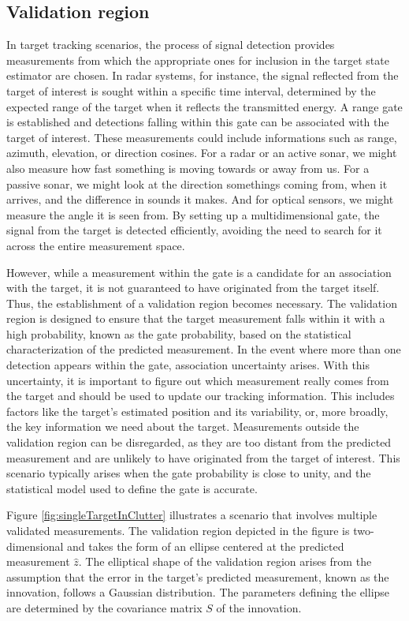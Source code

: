 \subsection{Validation region}
\label{sec:validation_region}
In target tracking scenarios, the process of signal detection provides measurements from which the appropriate ones
for inclusion in the target state estimator are chosen. In radar systems, for instance, the signal reflected from the
target of interest is sought within a specific time interval, determined by the expected range of the target when it
reflects the transmitted energy. A range gate is established and detections falling within this gate can be
associated with the target of interest. These measurements could include informations such as range, azimuth, elevation,
or direction cosines. For a radar or an active sonar, we might also measure how fast something is moving towards or away
from us. For a passive sonar, we might look at the direction somethings coming from, when it arrives, and the
difference in sounds it makes. And for optical sensors, we might measure the angle it is seen from. By setting up a
multidimensional gate, the signal from the target is detected efficiently, avoiding the need to search for it across the entire measurement space.

However, while a measurement within the gate is a candidate for an association with the target, it is not guaranteed to
have originated from the target itself. Thus, the establishment of a validation region becomes necessary. The
validation region is designed to ensure that the target measurement falls within it with a high probability, known as
the gate probability, based on the statistical characterization of the predicted measurement. In the event where more
than one detection appears within the gate, association uncertainty arises. With this uncertainty, it is important to
figure out which measurement really comes from the target and should be used to update our tracking information. This includes factors like the target's estimated position and its variability, or, more broadly, the key information we need about the target. Measurements outside the validation region can be disregarded, as they are too distant from the predicted measurement and are unlikely to have originated from the target of interest. This scenario typically arises when the gate probability is close to unity, and the statistical model used to define the gate is accurate.

Figure \ref{fig:singleTargetInClutter} illustrates a scenario that involves multiple validated measurements. The validation region depicted in the
figure is two-dimensional and takes the form of an ellipse centered at the predicted measurement $\hat{z}$. The
elliptical shape of the validation region arises from the assumption that the error in the target's predicted
measurement, known as the innovation, follows a Gaussian distribution. The parameters defining the ellipse are
determined by the covariance matrix $S$ of the innovation.

